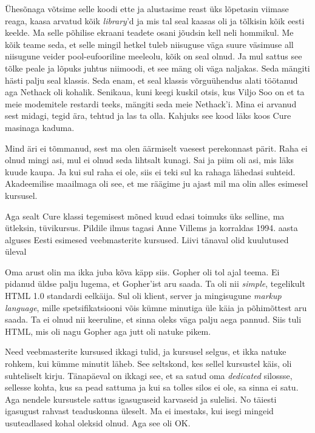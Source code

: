 Ühesõnaga võtsime selle koodi ette ja alustasime reast üks lõpetasin viimase 
reaga, kaasa arvatud kõik \emph{library}'d ja mis tal seal kaasas oli ja 
tõlkisin  kõik eesti keelde. Ma selle põhilise ekraani teadete osani jõudsin 
kell neli hommikul. Me kõik teame seda, et selle mingil hetkel tuleb niisuguse 
väga suure väsimuse all niisugune veider pool-eufooriline meeleolu, kõik on 
seal olnud. Ja mul sattus see tõlke peale ja lõpuks juhtus niimoodi, et see 
mäng oli väga naljakas. Seda mängiti hästi palju seal klassis. Seda enam, et 
seal klassis võrguühendus alati töötanud aga Nethack oli kohalik. Senikaua, 
kuni keegi kuskil otsis, kus Viljo Soo on et ta meie 
modemitele restardi teeks, mängiti seda meie Nethack'i. Mina ei arvanud sest 
midagi, tegid ära, tehtud ja las ta olla. Kahjuks see kood läks koos Cure 
masinaga kaduma.


Mind äri ei tõmmanud, sest ma olen äärmiselt vaesest perekonnast pärit. Raha ei 
olnud mingi asi, mul ei olnud seda lihtsalt kunagi. Sai ja piim oli asi, mis 
läks kuude kaupa. Ja kui sul raha ei ole, siis ei teki sul ka rahaga lähedasi 
suhteid. Akadeemilise maailmaga oli see, et me räägime ju ajast mil ma olin 
alles esimesel kursusel.

Aga sealt Cure klassi tegemisest mõned kuud edasi toimuks üks selline, ma 
ütleksin, tüvikursus. Pildile ilmus tagasi Anne Villems ja korraldas 1994. aasta alguses Eesti esimesed veebmasterite kursused. 
Liivi tänaval olid kuulutused üleval

Oma arust olin ma ikka juba kõva käpp siis. 
Gopher oli tol ajal teema. Ei pidanud üldse palju lugema, et 
Gopher'ist aru saada. Ta oli nii \emph{simple},  tegelikult  HTML 1.0 standardi 
eelkäija. Sul oli klient, server ja mingisugune \emph{markup language}, mille 
spetsifikatsiooni võis kümne minutiga üle käia ja põhimõttest aru saada. Ta ei 
olnud nii keeruline, et sinna  oleks väga palju aega pannud. Siis tuli HTML, 
mis oli nagu Gopher aga jutt oli natuke pikem. 

Need veebmasterite kursused ikkagi tulid, ja kursusel selgus, et ikka natuke 
rohkem, kui kümme minutit läheb. See seltskond, kes sellel kursustel käis, oli 
suhteliselt kirju. Tänapäeval on ikkagi see, et sa satud oma \emph{dedicated} 
silossse, sellesse kohta, kus sa pead sattuma ja kui sa tolles silos ei ole, sa 
sinna ei satu. Aga nendele kursustele sattus igasuguseid karvaseid ja sulelisi. 
No täiesti igasugust rahvast teaduskonna üleselt. Ma ei imestaks, kui isegi 
mingeid usuteadlased kohal oleksid olnud. Aga see oli OK.

